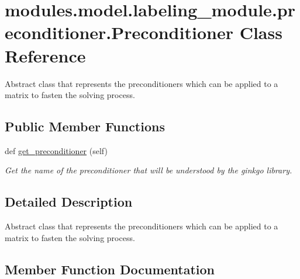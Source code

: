 \hypertarget{classmodules_1_1model_1_1labeling__module_1_1preconditioner_1_1_preconditioner}{}\section{modules.\+model.\+labeling\+\_\+module.\+preconditioner.\+Preconditioner Class Reference}
\label{classmodules_1_1model_1_1labeling__module_1_1preconditioner_1_1_preconditioner}


Abstract class that represents the preconditioners which can be applied to a matrix to fasten the solving process.  


\subsection*{Public Member Functions}
\begin{DoxyCompactItemize}
\item 
def \mbox{\hyperlink{classmodules_1_1model_1_1labeling__module_1_1preconditioner_1_1_preconditioner_a55fddb23099daf1c639c7d2612b146f9}{get\+\_\+preconditioner}} (self)
\begin{DoxyCompactList}\small\item\em Get the name of the preconditioner that will be understood by the ginkgo library. \end{DoxyCompactList}\end{DoxyCompactItemize}


\subsection{Detailed Description}
Abstract class that represents the preconditioners which can be applied to a matrix to fasten the solving process. 

\subsection{Member Function Documentation}
\mbox{\label{classmodules_1_1model_1_1labeling__module_1_1preconditioner_1_1_preconditioner_a55fddb23099daf1c639c7d2612b146f9}} 
